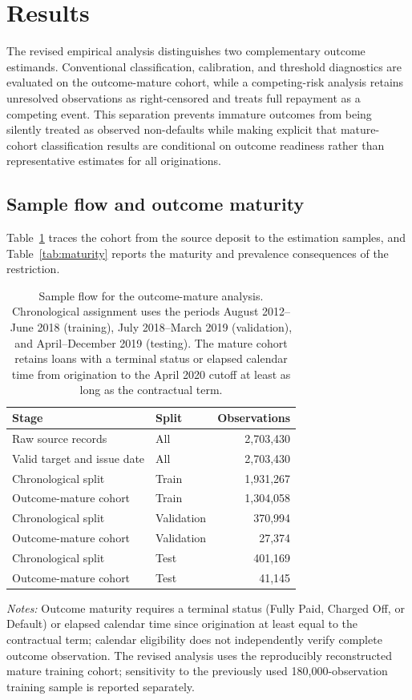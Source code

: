 \documentclass[10pt]{article}
\begin{document}
\section{Results}
\label{sec:reanalysis}

The revised empirical analysis distinguishes two complementary outcome estimands. Conventional classification, calibration, and threshold diagnostics are evaluated on the outcome-mature cohort, while a competing-risk analysis retains unresolved observations as right-censored and treats full repayment as a competing event. This separation prevents immature outcomes from being silently treated as observed non-defaults while making explicit that mature-cohort classification results are conditional on outcome readiness rather than representative estimates for all originations.

\subsection{Sample flow and outcome maturity}

Table~\ref{tab:flow_mature} traces the cohort from the source deposit to the estimation samples, and Table~\ref{tab:maturity} reports the maturity and prevalence consequences of the restriction.

\begin{table}[!ht]
\centering
\caption{Sample flow for the outcome-mature analysis. Chronological assignment uses the periods August 2012--June 2018 (training), July 2018--March 2019 (validation), and April--December 2019 (testing). The mature cohort retains loans with a terminal status or elapsed calendar time from origination to the April 2020 cutoff at least as long as the contractual term.}
\label{tab:flow_mature}
\begin{tabular}{llr}
\toprule
Stage & Split & Observations \\
\midrule
Raw source records & All & 2,703,430 \\
Valid target and issue date & All & 2,703,430 \\
\midrule
Chronological split & Train & 1,931,267 \\
Outcome-mature cohort & Train & 1,304,058 \\
Chronological split & Validation & 370,994 \\
Outcome-mature cohort & Validation & 27,374 \\
Chronological split & Test & 401,169 \\
Outcome-mature cohort & Test & 41,145 \\
\bottomrule
\end{tabular}

\vspace{3pt}
{\footnotesize \textit{Notes:} Outcome maturity requires a terminal status (Fully Paid, Charged Off, or Default) or elapsed calendar time since origination at least equal to the contractual term; calendar eligibility does not independently verify complete outcome observation. The revised analysis uses the reproducibly reconstructed mature training cohort; sensitivity to the previously used 180,000-observation training sample is reported separately.}
\end{table}
\end{document}
